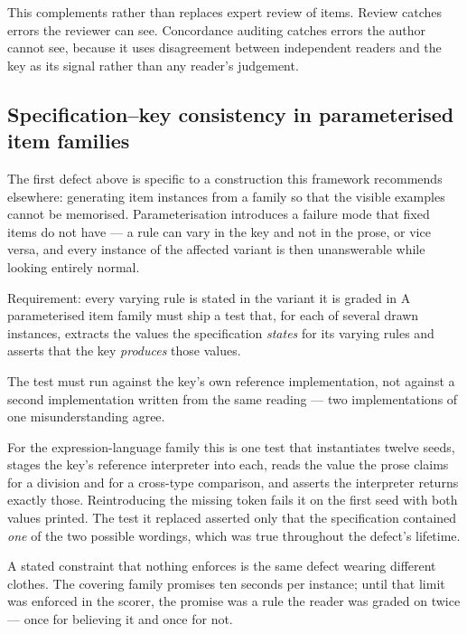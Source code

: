 \documentclass[11pt]{article}
\theoremstyle{definition}
\begin{document}
This complements rather than replaces expert review of items. Review catches errors the reviewer can see. Concordance auditing catches errors the author cannot see, because it uses disagreement between independent readers and the key as its signal rather than any reader's judgement.

\subsection{Specification--key consistency in parameterised item families}\label{sec:speckey}

The first defect above is specific to a construction this framework recommends elsewhere: generating item instances from a family so that the visible examples cannot be memorised. Parameterisation introduces a failure mode that fixed items do not have --- a rule can vary in the key and not in the prose, or vice versa, and every instance of the affected variant is then unanswerable while looking entirely normal.

\begin{claimbox}{Requirement: every varying rule is stated in the variant it is graded in}
A parameterised item family must ship a test that, for each of several drawn instances, extracts the values the specification \emph{states} for its varying rules and asserts that the key \emph{produces} those values.

The test must run against the key's own reference implementation, not against a second implementation written from the same reading --- two implementations of one misunderstanding agree.
\end{claimbox}

For the expression-language family this is one test that instantiates twelve seeds, stages the key's reference interpreter into each, reads the value the prose claims for a division and for a cross-type comparison, and asserts the interpreter returns exactly those. Reintroducing the missing token fails it on the first seed with both values printed. The test it replaced asserted only that the specification contained \emph{one} of the two possible wordings, which was true throughout the defect's lifetime.

A stated constraint that nothing enforces is the same defect wearing different clothes. The covering family promises ten seconds per instance; until that limit was enforced in the scorer, the promise was a rule the reader was graded on twice --- once for believing it and once for not.
\end{document}

